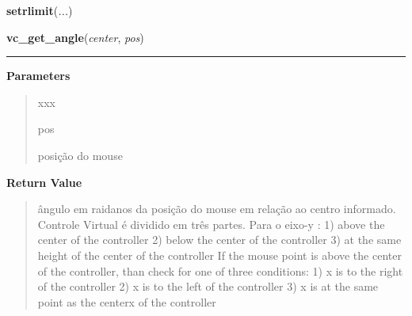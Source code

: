     \label{pygame-asteroids:states:franchise':setrlimit}

    \vspace{0.5ex}

\hspace{.8\funcindent}\begin{boxedminipage}{\funcwidth}

    \raggedright \textbf{setrlimit}(\textit{...})

\setlength{\parskip}{2ex}
\setlength{\parskip}{1ex}
    \end{boxedminipage}

    \label{pygame-asteroids:virtual_controller:vc_get_angle}

    \vspace{0.5ex}

\hspace{.8\funcindent}\begin{boxedminipage}{\funcwidth}

    \raggedright \textbf{vc\_get\_angle}(\textit{center}, \textit{pos})

    \vspace{-1.5ex}

    \rule{\textwidth}{0.5\fboxrule}
\setlength{\parskip}{2ex}
\setlength{\parskip}{1ex}
      \textbf{Parameters}
      \vspace{-1ex}

      \begin{quote}
        \begin{Ventry}{xxx}

          \item[pos]

          posição do mouse

        \end{Ventry}

      \end{quote}

      \textbf{Return Value}
    \vspace{-1ex}

      \begin{quote}
      ângulo em raidanos da posição do mouse em relação ao centro 
      informado. Controle Virtual é dividido em três partes. Para o eixo-y 
      : 1) above the center of the controller 2) below the center of the 
      controller 3) at the same height of the center of the controller If 
      the mouse point is above the center of the controller, than check for
      one of three conditions: 1) x is to the right of the controller 2) x 
      is to the left of the controller 3) x is at the same point as the 
      centerx of the controller

      \end{quote}

    \end{boxedminipage}


